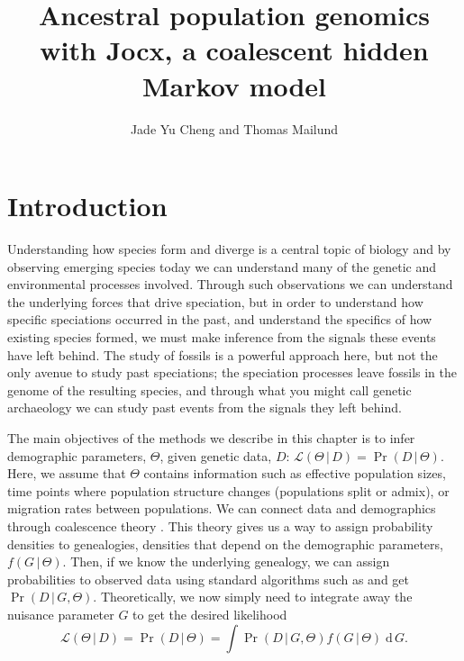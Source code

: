 \documentclass[graybox]{svmult}
\renewcommand{\lhd}{\ensuremath{\mathcal{L}}}
\newcommand{\intd}{\ensuremath{\mathrm{\;d\,}}}
\begin{document}
\title*{Ancestral population genomics with Jocx, a coalescent hidden Markov model}
\author{Jade Yu Cheng and Thomas Mailund}
\maketitle



\section{Introduction}

Understanding how species form and diverge is a central topic of biology and by observing emerging species today we can understand many of the genetic and environmental processes involved. Through such observations we can understand the underlying forces that drive speciation, but in order to understand how specific speciations occurred in the past, and understand the specifics of how existing species formed, we must make inference from the signals these events have left behind. The study of fossils is a powerful approach here, but not the only avenue to study past speciations; the speciation processes leave fossils in the genome of the resulting species, and through what you might call genetic archaeology we can study past events from the signals they left behind.


The main objectives of the methods we describe in this chapter is to infer demographic parameters, $\Theta$, given genetic data, $D$: $\lhd(\Theta\,|\,D)=\Pr(D\,|\,\Theta)$. Here, we assume that $\Theta$ contains information such as effective population sizes, time points where population structure changes (populations split or admix), or migration rates between populations. We can connect data and demographics through coalescence theory \cite{Hein:2004ta}. This theory gives us a way to assign probability densities to genealogies, densities that depend on the demographic parameters, $f(G\,|\,\Theta)$. Then, if we know the underlying genealogy, we can assign probabilities to observed data using standard algorithms such as \citet{Felsenstein_1981} and get $\Pr(D\,|\,G,\Theta)$. Theoretically, we now simply need to integrate away the nuisance parameter $G$ to get the desired likelihood
\begin{equation}
	\label{eq:likelihood}
	\lhd(\Theta\,|\,D) = \Pr(D\,|\,\Theta)
	= \int \Pr(D\,|\,G,\Theta) f(G\,|\,\Theta) \intd G .
\end{equation}
\end{document}
